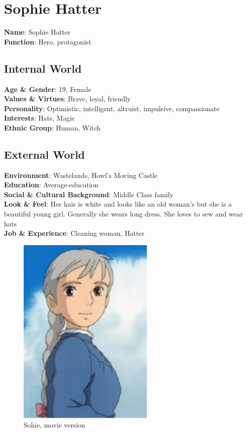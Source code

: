 \section{Sophie Hatter}

\begin{minipage}{0.5\textwidth}
\textbf{Name}: Sophie Hatter \\
\textbf{Function}: Hero, protagonist

\subsection{Internal World}

\textbf{Age \& Gender}: 19, Female \\
\textbf{Values \& Virtues}: Brave, loyal, friendly \\
\textbf{Personality}: Optimistic, intelligent, altruist, impulsive, compassionate \\
\textbf{Interests}: Hats, Magic \\
\textbf{Ethnic Group}: Human, Witch

\subsection{External World}
\textbf{Environment}: Wastelands, Howl’s Moving Castle \\
\textbf{Education}: Average-education \\
\textbf{Social \& Cultural Background}: Middle Class family \\
\textbf{Look \& Feel}: Her hair is white and looks like an old woman’s but she is a beautiful young girl. Generally she wears long dress. She loves to sew and wear hats \\
\textbf{Job \& Experience}: Cleaning woman, Hatter \\

\end{minipage}%
%
\hfill\begin{minipage}{0.4\textwidth}
\begin{figure}[H]
    \includegraphics{Images/Characters/sophie}
  \caption{Sohie, movie version}
  \end{figure}
\end{minipage}

